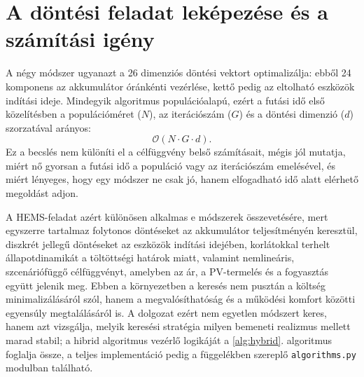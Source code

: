 \section{A döntési feladat leképezése és a számítási igény}
A négy módszer ugyanazt a 26 dimenziós döntési vektort optimalizálja: ebből 24 komponens az akkumulátor óránkénti vezérlése, kettő pedig az eltolható eszközök indítási ideje. Mindegyik algoritmus populációalapú, ezért a futási idő első közelítésben a populációméret ($N$), az iterációszám ($G$) és a döntési dimenzió ($d$) szorzatával arányos:
\begin{equation}
\mathcal{O}(N \cdot G \cdot d).
\end{equation}
Ez a becslés nem különíti el a célfüggvény belső számításait, mégis jól mutatja, miért nő gyorsan a futási idő a populáció vagy az iterációszám emelésével, és miért lényeges, hogy egy módszer ne csak jó, hanem elfogadható idő alatt elérhető megoldást adjon.

A HEMS-feladat azért különösen alkalmas e módszerek összevetésére, mert egyszerre tartalmaz folytonos döntéseket az akkumulátor teljesítményén keresztül, diszkrét jellegű döntéseket az eszközök indítási idejében, korlátokkal terhelt állapotdinamikát a töltöttségi határok miatt, valamint nemlineáris, szcenáriófüggő célfüggvényt, amelyben az ár, a PV-termelés és a fogyasztás együtt jelenik meg. Ebben a környezetben a keresés nem pusztán a költség minimalizálásáról szól, hanem a megvalósíthatóság és a működési komfort közötti egyensúly megtalálásáról is. A dolgozat ezért nem egyetlen módszert keres, hanem azt vizsgálja, melyik keresési stratégia milyen bemeneti realizmus mellett marad stabil; a hibrid algoritmus vezérlő logikáját a \ref{alg:hybrid}. algoritmus foglalja össze, a teljes implementáció pedig a függelékben szereplő \texttt{algorithms.py} modulban található.
